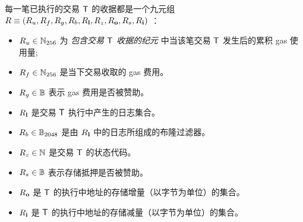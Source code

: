 每一笔已执行的交易 $\textsf{T}$ 的收据都是一个九元组 $R\equiv \left(R_u, R_f, R_g, R_b, R_{\bf l}, R_z,R_{\bf o},R_s,R_{\bf i}\right)$ ：
\begin{itemize}[nosep]
	\item $R_u\in\mathbb{N}_{256}$ 为 \emph{包含交易 $\textsf{T}$ 收据的纪元} 中当该笔交易 $\textsf{T}$ 发生后的累积 gas 使用量;
	
	\item $R_f\in\mathbb{N}_{256}$ 是当下交易收取的 gas 费用。
	
	\item $R_g \in \mathbb{B}$ 表示 gas 费用是否被赞助。

	\item $R_{\bf l}$ 是交易 $\textsf{T}$ 执行中产生的日志集合。

	\item $R_b\in\mathbb{B}_{2048}$ 是由 $R_{\bf l}$ 中的日志所组成的布隆过滤器。

	\item $R_z\in\mathbb{N}$ 是交易 $\textsf{T}$ 的状态代码。
	
	\item $R_s \in \mathbb{B}$ 表示存储抵押是否被赞助。
	
	\item $R_{\bf o}$ 是 $\textsf{T}$ 的执行中地址的存储增量（以字节为单位）的集合。

	\item $R_{\bf i}$ 是 $\textsf{T}$ 的执行中地址的存储减量（以字节为单位）的集合。
\end{itemize}

